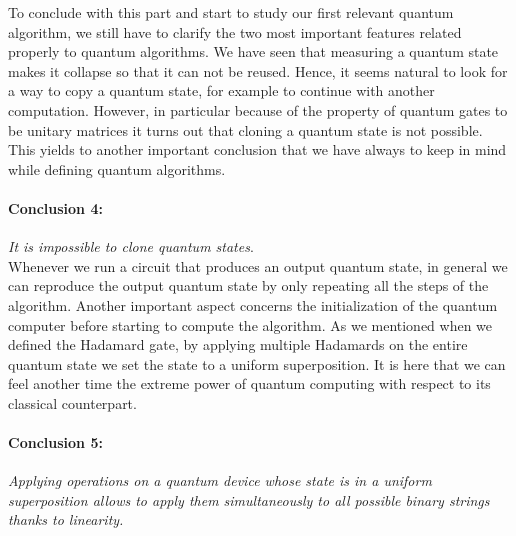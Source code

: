 \documentclass[english]{article}
\begin{document}
			To conclude with this part and start to study our first relevant quantum algorithm, we still have to clarify the two most important features related properly to quantum algorithms. We have seen that measuring a quantum state makes it collapse so that it can not be reused. Hence, it seems natural to look for a way to copy a quantum state, for example to continue with another computation. However, in particular because of the property of quantum gates to be unitary matrices it turns out that cloning a quantum state is not possible. This yields to another important conclusion that we have always to keep in mind while defining quantum algorithms.
			
			\paragraph{Conclusion 4:} \label{conc:noCloning} \emph{It is impossible to clone quantum states}.\\
			
			Whenever we run a circuit that produces an output quantum state, in general we can reproduce the output quantum state by only repeating all the steps of the algorithm.
			Another important aspect concerns the initialization of the quantum computer before starting to compute the algorithm. As we mentioned when we defined the Hadamard gate, by applying multiple Hadamards on the entire quantum state we set the state to a uniform superposition. It is here that we can feel another time the extreme power of quantum computing with respect to its classical counterpart.
			
			\paragraph{Conclusion 5:} \label{conc:superposition} \emph{Applying operations on a quantum device whose state is in a uniform superposition allows to apply them simultaneously to all possible binary strings thanks to linearity.} 
			
\end{document}

